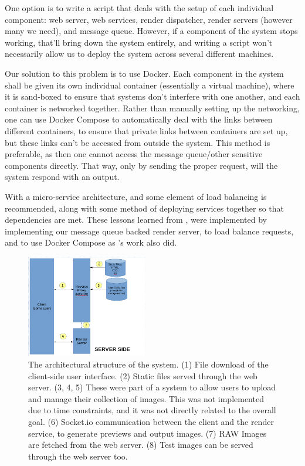 \documentclass[10pt,a4paper]{article}
\begin{document}
One option is to write a script that deals with the setup of each individual component: web server, web services, render dispatcher, render servers (however many we need),
and message queue. However, if a component of the system stops working, that'll bring down the system entirely, and writing a script won't necessarily allow us to deploy the system
across several different machines.

Our solution to this problem is to use Docker. Each component in the system shall be given its own individual container (essentially a virtual machine), where
it is sand-boxed to ensure that systems don't interfere with one another, and each container is networked together. Rather than manually setting up the networking,
one can use Docker Compose to automatically deal with the links between different containers, to ensure that private links between containers are set up, but these links
can't be accessed from outside the system. This method is preferable, as then one cannot access the message queue/other sensitive components directly. That way, only by sending
the proper request, will the system respond with an output. 

With a micro-service architecture, and some element of load balancing is recommended, along with some method of deploying services together so that dependencies
are met. These lessons learned from \cite{Docker}, were implemented by implementing our message queue backed render server, to load balance requests,
and to use Docker Compose as \citeauthor{Docker}'s work also did.


\begin{figure}
\centering
\includegraphics[width=200px]{architecture}
\caption{The architectural structure of the system. (1) File download of the client-side user interface. (2) Static files served through the web server.
(3, 4, 5) These were part of a system to allow users to upload and manage their collection of images. This was not implemented due to time constraints, and it was not directly related to the overall goal. (6) Socket.io communication
between the client and the render service, to generate previews and output images. (7) RAW Images are fetched from the web server.  (8) Test images can be served through the web server too.}
\label{architecturediagram}
\end{figure}
\end{document}
